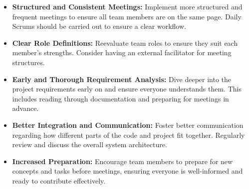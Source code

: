 \documentclass[12pt]{report}
\begin{document}
\begin{itemize}
  \item \textbf{Structured and Consistent Meetings:} Implement more structured and frequent meetings to ensure all team members are on the same page. Daily Scrums should be carried out to ensure a clear workflow.
  \item \textbf{Clear Role Definitions:} Reevaluate team roles to ensure they suit each member's strengths. Consider having an external facilitator for meeting structures.
  \item \textbf{Early and Thorough Requirement Analysis:} Dive deeper into the project requirements early on and ensure everyone understands them. This includes reading through documentation and preparing for meetings in advance.
  \item \textbf{Better Integration and Communication:} Foster better communication regarding how different parts of the code and project fit together. Regularly review and discuss the overall system architecture.
  \item \textbf{Increased Preparation:} Encourage team members to prepare for new concepts and tasks before meetings, ensuring everyone is well-informed and ready to contribute effectively.
\end{itemize}
\end{document}
